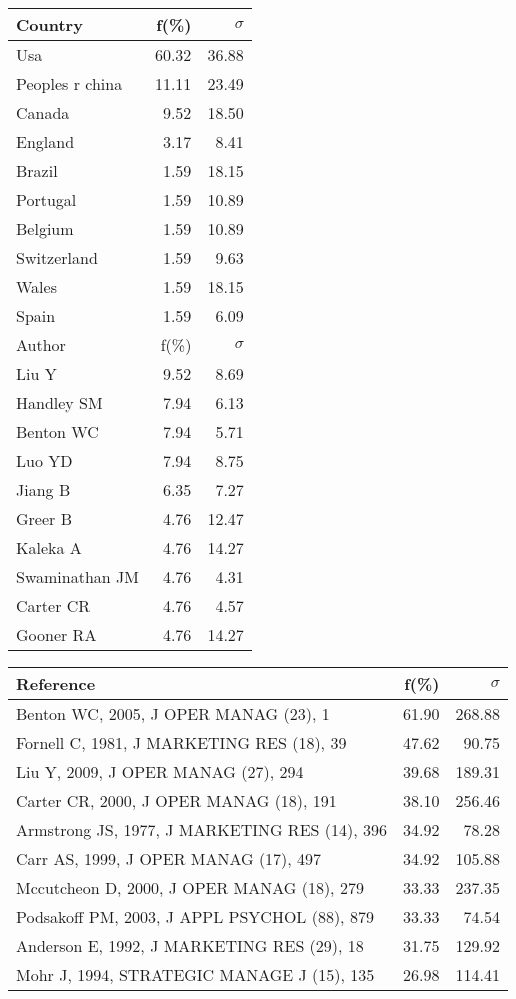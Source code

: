 \documentclass[a4paper,11pt]{report}
\begin{document}
\begin{landscape}
\begin{table}[!ht]
{\begin{tabular}{|l r r|}
Country & f(\%) & $\sigma$\\
\hline
Usa & 60.32 & 36.88\\
Peoples r china & 11.11 & 23.49\\
Canada & 9.52 & 18.50\\
England & 3.17 & 8.41\\
Brazil & 1.59 & 18.15\\
Portugal & 1.59 & 10.89\\
Belgium & 1.59 & 10.89\\
Switzerland & 1.59 & 9.63\\
Wales & 1.59 & 18.15\\
Spain & 1.59 & 6.09\\
\hline
\hline
Author & f(\%) & $\sigma$\\
\hline
Liu Y & 9.52 & 8.69\\
Handley SM & 7.94 & 6.13\\
Benton WC & 7.94 & 5.71\\
Luo YD & 7.94 & 8.75\\
Jiang B & 6.35 & 7.27\\
Greer B & 4.76 & 12.47\\
Kaleka A & 4.76 & 14.27\\
Swaminathan JM & 4.76 & 4.31\\
Carter CR & 4.76 & 4.57\\
Gooner RA & 4.76 & 14.27\\
\hline
\end{tabular}
}
{\scriptsize\begin{tabular}{|l r r|}
\hline
Reference & f(\%) & $\sigma$\\
\hline
Benton WC, 2005, J OPER MANAG (23), 1 & 61.90 & 268.88\\
Fornell C, 1981, J MARKETING RES (18), 39 & 47.62 & 90.75\\
Liu Y, 2009, J OPER MANAG (27), 294 & 39.68 & 189.31\\
Carter CR, 2000, J OPER MANAG (18), 191 & 38.10 & 256.46\\
Armstrong JS, 1977, J MARKETING RES (14), 396 & 34.92 & 78.28\\
Carr AS, 1999, J OPER MANAG (17), 497 & 34.92 & 105.88\\
Mccutcheon D, 2000, J OPER MANAG (18), 279 & 33.33 & 237.35\\
Podsakoff PM, 2003, J APPL PSYCHOL (88), 879 & 33.33 & 74.54\\
Anderson E, 1992, J MARKETING RES (29), 18 & 31.75 & 129.92\\
Mohr J, 1994, STRATEGIC MANAGE J (15), 135 & 26.98 & 114.41\\

\end{tabular}}
\end{table}
\end{landscape}
\end{document}

